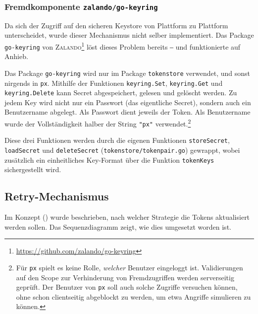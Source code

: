 \subsubsection{Fremdkomponente \texttt{zalando/go-keyring}}

Da sich der Zugriff auf den sicheren Keystore von Plattform zu Plattform unterscheidet, wurde dieser Mechanismus nicht selber implementiert. Das Package \texttt{go-keyring} von \textsc{Zalando}\footnote{\url{https://github.com/zalando/go-keyring}} löst dieses Problem bereits ‒ und funktionierte auf Anhieb.

Das Package \texttt{go-keyring} wird nur im Package \texttt{tokenstore} verwendet, und sonst nirgends in \texttt{px}. Mithilfe der Funktionen \texttt{keyring.Set}, \texttt{keyring.Get} und \texttt{keyring.Delete} kann Secret abgespeichert, gelesen und gelöscht werden. Zu jedem Key wird nicht nur ein Passwort (das eigentliche Secret), sondern auch ein Benutzername abgelegt. Als Passwort dient jeweils der Token. Als Benutzername wurde der Vollständigkeit halber der String \texttt{"px"} verwendet.\footnote{Für \texttt{px} spielt es keine Rolle, \textit{welcher} Benutzer eingeloggt ist. Validierungen auf den Scope zur Verhinderung von Fremdzugriffen werden serverseitig geprüft. Der Benutzer von \texttt{px} soll auch solche Zugriffe versuchen können, ohne schon clientseitig abgeblockt zu werden, um etwa Angriffe simulieren zu können.}

Diese drei Funktionen werden durch die eigenen Funktionen \texttt{storeSecret}, \texttt{loadSecret} und \texttt{deleteSecret} (\texttt{tokenstore/tokenpair.go}) gewrappt, wobei zusätzlich ein einheitliches Key-Format über die Funktion \texttt{tokenKeys} sichergestellt wird.

\subsection{Retry-Mechanismus}
\label{sec:Retry-Mechanismus}

Im Konzept () wurde beschrieben, nach welcher Strategie die Tokens aktualisiert werden sollen. Das Sequenzdiagramm  zeigt, wie dies umgesetzt worden ist.

